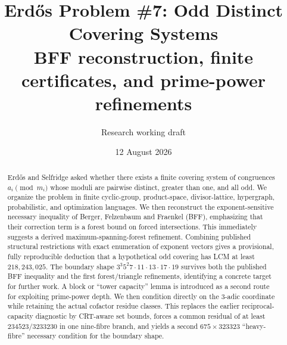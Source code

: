 \documentclass[11pt]{article}
\title{Erd\H{o}s Problem \#7: Odd Distinct Covering Systems\\
\large BFF reconstruction, finite certificates, and prime-power refinements}
\author{Research working draft}
\date{12 August 2026}
\theoremstyle{definition}
\begin{document}
\maketitle

\begin{center}
\end{center}

\begin{abstract}
Erd\H{o}s and Selfridge asked whether there exists a finite covering system of congruences
$a_i\pmod{m_i}$ whose moduli are pairwise distinct, greater than one, and all odd.  We organize
the problem in finite cyclic-group, product-space, divisor-lattice, hypergraph, probabilistic,
and optimization languages.  We then reconstruct the exponent-sensitive necessary inequality
of Berger, Felzenbaum and Fraenkel (BFF), emphasizing that their correction term is a forest
bound on forced intersections.  This immediately suggests a derived maximum-spanning-forest
refinement.  Combining published structural restrictions with exact enumeration of exponent
vectors gives a provisional, fully reproducible deduction that a hypothetical odd covering has
LCM at least $218{,}243{,}025$.  The boundary shape
$3^3 5^2 7\cdot11\cdot13\cdot17\cdot19$ survives both the published BFF inequality and the
first forest/triangle refinements, identifying a concrete target for further work.  A block or
``tower capacity'' lemma is introduced as a second route for exploiting prime-power depth.  We
then condition directly on the $3$-adic coordinate while retaining the actual cofactor residue
classes.  This replaces the earlier reciprocal-capacity diagnostic by CRT-aware set bounds,
forces a common residual of at least $234523/3233230$ in one nine-fibre branch, and yields a
second $675\times323323$ ``heavy-fibre'' necessary condition for the boundary shape.
\end{abstract}

\tableofcontents
\end{document}
